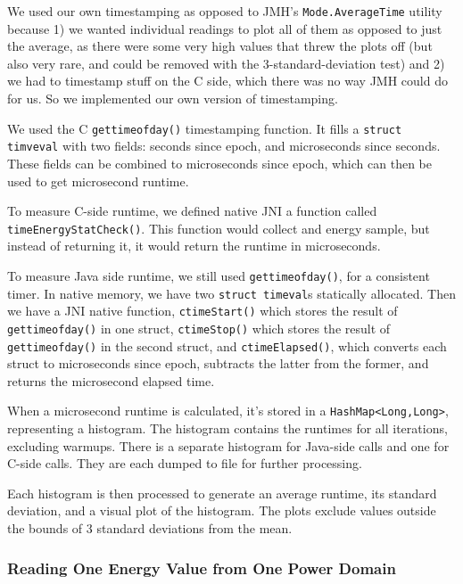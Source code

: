     We used our own timestamping as opposed to JMH's \texttt{Mode.AverageTime} utility because 1) we wanted individual readings to plot all of them as opposed to just the average, as there were some very high values that threw the plots off (but also very rare, and could be removed with the 3-standard-deviation test) and 2) we had to timestamp stuff on the C side, which there was no way JMH could do for us. So we implemented our own version of timestamping.
    
    We used the C \texttt{gettimeofday()} timestamping function. It fills a \texttt{struct 
    timveval} with two fields: seconds since epoch, and microseconds since seconds. These fields can be combined to microseconds since epoch, which can then be used to get microsecond runtime.
    
    To measure C-side runtime, we defined native JNI a function called \texttt{timeEnergyStatCheck()}. This function would collect and energy sample, but instead of returning it, it would return the runtime in microseconds.
    
    To measure Java side runtime, we still used \texttt{gettimeofday()}, for a consistent timer. In native memory, we have two \texttt{struct timeval}s statically allocated. Then we have a JNI native function, \texttt{ctimeStart()} which stores the result of \texttt{gettimeofday()} in one struct, \texttt{ctimeStop()} which stores the result of \texttt{gettimeofday()} in the second struct, and \texttt{ctimeElapsed()}, which converts each struct to microseconds since epoch, subtracts the latter from the former, and returns the microsecond elapsed time.
    
    When a microsecond runtime is calculated, it's stored in a \texttt{HashMap<Long,Long>}, representing a histogram. The histogram contains the runtimes for all iterations, excluding warmups. There is a separate histogram for Java-side calls and one for C-side calls. They are each dumped to file for further processing.
    
    Each histogram is then processed to generate an average runtime, its standard deviation, and a visual plot of the histogram. The plots exclude values outside the bounds of 3 standard deviations from the mean.

\subsubsection{Reading One Energy Value from One Power Domain}
    
